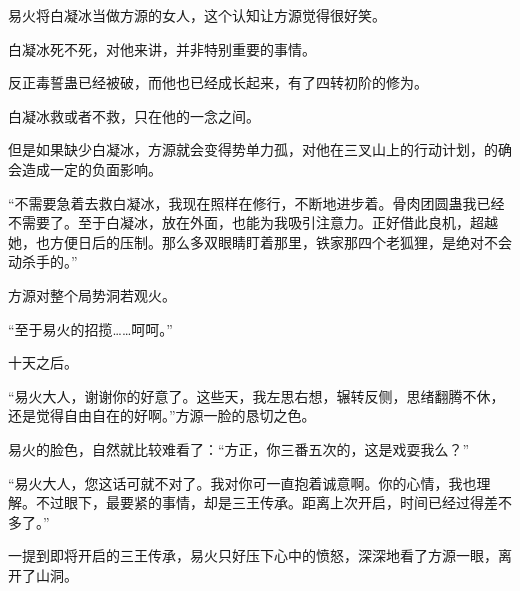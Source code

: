 \begin{this_body}
易火将白凝冰当做方源的女人，这个认知让方源觉得很好笑。

白凝冰死不死，对他来讲，并非特别重要的事情。

反正毒誓蛊已经被破，而他也已经成长起来，有了四转初阶的修为。

白凝冰救或者不救，只在他的一念之间。

但是如果缺少白凝冰，方源就会变得势单力孤，对他在三叉山上的行动计划，的确会造成一定的负面影响。

“不需要急着去救白凝冰，我现在照样在修行，不断地进步着。骨肉团圆蛊我已经不需要了。至于白凝冰，放在外面，也能为我吸引注意力。正好借此良机，超越她，也方便日后的压制。那么多双眼睛盯着那里，铁家那四个老狐狸，是绝对不会动杀手的。”

方源对整个局势洞若观火。

“至于易火的招揽……呵呵。”

十天之后。

“易火大人，谢谢你的好意了。这些天，我左思右想，辗转反侧，思绪翻腾不休，还是觉得自由自在的好啊。”方源一脸的恳切之色。

易火的脸色，自然就比较难看了：“方正，你三番五次的，这是戏耍我么？”

“易火大人，您这话可就不对了。我对你可一直抱着诚意啊。你的心情，我也理解。不过眼下，最要紧的事情，却是三王传承。距离上次开启，时间已经过得差不多了。”

一提到即将开启的三王传承，易火只好压下心中的愤怒，深深地看了方源一眼，离开了山洞。

\end{this_body}


